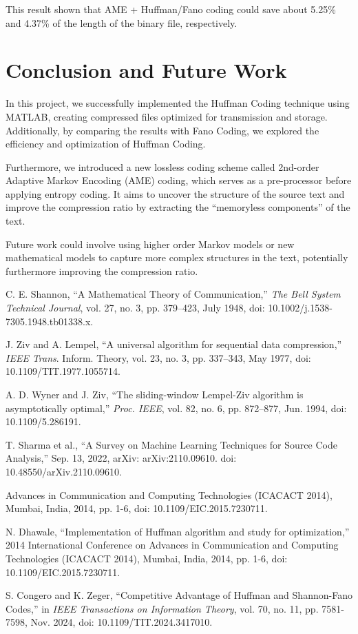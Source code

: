\documentclass[12pt,twoside]{article}
\begin{document}
This result shown that AME + Huffman/Fano coding could save about 5.25\% and 4.37\% of the length of the binary file, respectively. 


\section{Conclusion and Future Work}

In this project, we successfully implemented the Huffman Coding technique using MATLAB, creating compressed files optimized for transmission and storage. Additionally, by comparing the results with Fano Coding, we explored the efficiency and optimization of Huffman Coding.

Furthermore, we introduced a new lossless coding scheme called 2nd-order Adaptive Markov Encoding (AME) coding, which serves as a pre-processor before applying entropy coding. It aims to uncover the structure of the source text and improve the compression ratio by extracting the ``memoryless components'' of the text. 

Future work could involve using higher order Markov models or new mathematical models to capture more complex structures in the text, potentially furthermore improving the compression ratio. 



\begin{thebibliography}{9}
     C. E. Shannon, ``A Mathematical Theory of Communication,'' \textit{The Bell System Technical Journal}, vol. 27, no. 3, pp. 379–423, July 1948, doi: 10.1002/j.1538-7305.1948.tb01338.x.

     J. Ziv and A. Lempel, “A universal algorithm for sequential data compression,” \textit{IEEE Trans}. Inform. Theory, vol. 23, no. 3, pp. 337–343, May 1977, doi: 10.1109/TIT.1977.1055714.

     A. D. Wyner and J. Ziv, “The sliding-window Lempel-Ziv algorithm is asymptotically optimal,” \textit{Proc. IEEE}, vol. 82, no. 6, pp. 872–877, Jun. 1994, doi: 10.1109/5.286191.

     T. Sharma et al., ``A Survey on Machine Learning Techniques for Source Code Analysis,'' Sep. 13, 2022, arXiv: arXiv:2110.09610. doi: 10.48550/arXiv.2110.09610.

     Advances in Communication and Computing Technologies (ICACACT 2014), Mumbai, India, 2014, pp. 1-6, doi: 10.1109/EIC.2015.7230711.

     N. Dhawale, ``Implementation of Huffman algorithm and study for optimization,'' 2014 International Conference on Advances in Communication and Computing Technologies (ICACACT 2014), Mumbai, India, 2014, pp. 1-6, doi: 10.1109/EIC.2015.7230711.

     S. Congero and K. Zeger, ``Competitive Advantage of Huffman and Shannon-Fano Codes,'' in \textit{IEEE Transactions on Information Theory}, vol. 70, no. 11, pp. 7581-7598, Nov. 2024, doi: 10.1109/TIT.2024.3417010.




\end{thebibliography}
\end{document}
